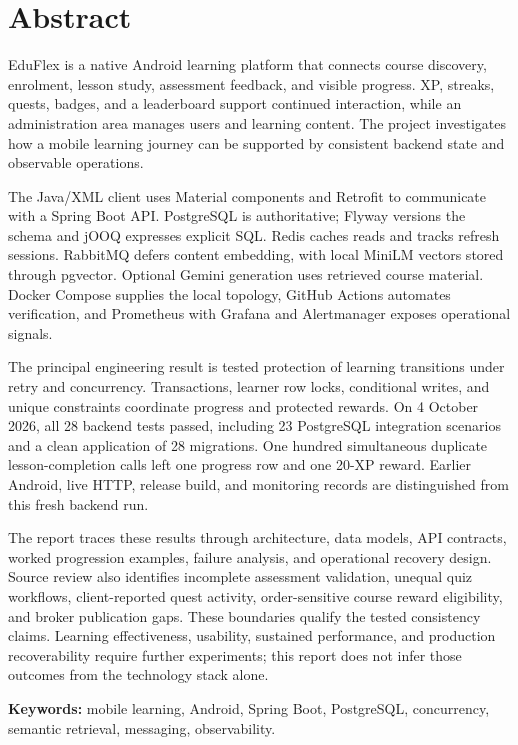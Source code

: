 \documentclass[12pt,a4paper,oneside]{report}
\newcommand{\backendtests}{28}
\newcommand{\integrationtests}{23}
\newcommand{\migrationcount}{28}
\newcommand{\verificationdate}{4 October 2026}
\begin{document}
\chapter*{Abstract}
EduFlex is a native Android learning platform that connects course discovery,
enrolment, lesson study, assessment feedback, and visible progress. XP, streaks,
quests, badges, and a leaderboard support continued interaction, while an
administration area manages users and learning content. The project investigates
how a mobile learning journey can be supported by consistent backend state and
observable operations.

The Java/XML client uses Material components and Retrofit to communicate with a
Spring Boot API. PostgreSQL is authoritative; Flyway versions the schema and jOOQ
expresses explicit SQL. Redis caches reads and tracks refresh sessions. RabbitMQ
defers content embedding, with local MiniLM vectors stored through pgvector.
Optional Gemini generation uses retrieved course material. Docker Compose supplies
the local topology, GitHub Actions automates verification, and Prometheus with
Grafana and Alertmanager exposes operational signals.

The principal engineering result is tested protection of learning transitions under
retry and concurrency. Transactions, learner row locks, conditional writes, and
unique constraints coordinate progress and protected rewards. On
\verificationdate{}, all \backendtests{} backend tests passed, including
\integrationtests{} PostgreSQL integration scenarios and a clean application of
\migrationcount{} migrations. One hundred simultaneous duplicate lesson-completion
calls left one progress row and one 20-XP reward. Earlier Android, live HTTP, release
build, and monitoring records are distinguished from this fresh backend run.

The report traces these results through architecture, data models, API contracts,
worked progression examples, failure analysis, and operational recovery design.
Source review also identifies incomplete assessment validation, unequal quiz
workflows, client-reported quest activity, order-sensitive course reward eligibility,
and broker publication gaps. These boundaries qualify the tested consistency
claims. Learning effectiveness, usability, sustained performance, and production
recoverability require further experiments; this report does not infer those outcomes
from the technology stack alone.

\noindent\textbf{Keywords:} mobile learning, Android, Spring Boot, PostgreSQL,
concurrency, semantic retrieval, messaging, observability.
\end{document}
